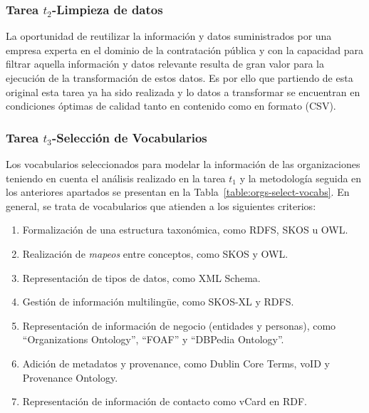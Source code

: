 \subsubsection{Tarea $t_2$-Limpieza de datos}
La oportunidad de reutilizar la información y datos suministrados por una empresa experta en el dominio de la 
contratación pública y con la capacidad para filtrar aquella información y datos relevante resulta de gran 
valor para la ejecución de la transformación de estos datos. Es por ello que partiendo de esta \dataset 
original esta tarea ya ha sido realizada y lo datos a transformar se encuentran en condiciones óptimas 
de calidad tanto en contenido como en formato (\gls{CSV}).

\subsubsection{Tarea $t_3$-Selección de Vocabularios}
Los vocabularios seleccionados para modelar la información de las organizaciones teniendo en cuenta el análisis 
realizado en la tarea $t_1$ y la metodología seguida en los anteriores apartados se presentan en la Tabla~\ref{table:orgs-select-vocabs}. 
En general, se trata de vocabularios que atienden a los siguientes criterios:

\begin{enumerate}
 \item Formalización de una estructura taxonómica, como RDFS, \gls{SKOS} u \gls{OWL}.
 \item Realización de \textit{mapeos} entre conceptos, como SKOS y OWL.
 \item Representación de tipos de datos, como \gls{XML Schema}.
 \item Gestión de información multiling\"{u}e, como SKOS-XL y RDFS.
 \item Representación de información de negocio (entidades y personas), como ``Organizations Ontology'', ``\gls{FOAF}'' y ``DBPedia Ontology''.
 \item Adición de metadatos y provenance, como Dublin Core Terms, \gls{voID} y Provenance Ontology.
 \item Representación de información de contacto como vCard en RDF.
\end{enumerate}


